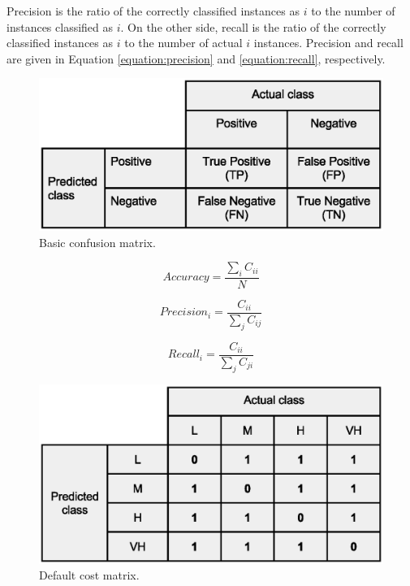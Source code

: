 \documentclass[a4paper,10pt,onecolumn,preprint,3p]{elsarticle}
\begin{document}
Precision is the ratio of the correctly classified instances as $i$ to the number of instances classified as $i$. On the other side, recall is the ratio of the correctly classified instances as $i$ to the number of actual $i$ instances. Precision and recall are given in Equation \ref{equation:precision} and \ref{equation:recall}, respectively.


\begin{figure}[ht]
\begin{center}
\includegraphics[scale=0.50]{Confusion-matrix}
\end{center}
\caption{Basic confusion matrix.}
\label{fig:confusionmatrix}
\end{figure}

\begin{equation}
Accuracy=\frac{\sum_{i}C_{ii}}{N}
\label{equation:acc}
\end{equation}


\begin{equation}
Precision_{i}=\frac{C_{ii}}{\sum_{j}C_{ij}}
\label{equation:precision}
\end{equation}


\begin{equation}
Recall_{i}=\frac{C_{ii}}{\sum_{j}C_{ji}}
\label{equation:recall}
\end{equation}

\begin{figure}[ht]
\begin{center}
\includegraphics[scale=0.40]{Confusion-matrix-multiclass-default}
\end{center}
\caption{Default cost matrix.}
\label{fig:Default_cost_matrix}
\end{figure}
\end{document}
